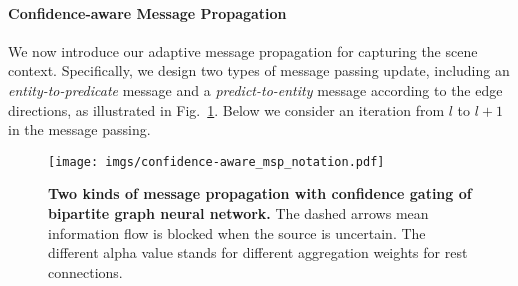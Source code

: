 


\vspace{-4mm}
\paragraph{Confidence-aware Message Propagation}%
We now introduce our adaptive message propagation for capturing the scene context. Specifically, we design two types of message passing update, including an \textit{entity-to-predicate} message and a \textit{predict-to-entity} message according to the edge directions, as illustrated in Fig.~\ref{fig:confidence_aware_msp}. Below we consider an iteration from $l$ to $l+1$ in the message passing.
\begin{figure}
    \centering
    \texttt{[image: imgs/confidence-aware\_msp\_notation.pdf]}
    \caption{\textbf{Two kinds of message propagation with confidence gating of bipartite graph neural network.}
    The dashed arrows mean information flow is blocked when the source is uncertain.
    The different alpha value stands for different aggregation weights for rest connections.
    }
    \label{fig:confidence_aware_msp} 
    \vspace{-4mm}
\end{figure}


